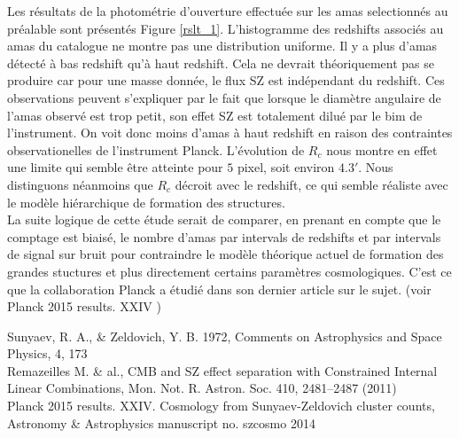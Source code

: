 \documentclass[a4paper,11pt]{article}
\begin{document}
Les résultats de la photométrie d'ouverture effectuée sur les amas
selectionnés au préalable sont présentés Figure
\ref{rslt_1}. L'histogramme des redshifts associés au amas du
catalogue ne montre pas une distribution uniforme. Il y a plus
d'amas détecté à bas redshift qu'à haut redshift. Cela ne devrait
théoriquement pas se produire car pour une masse donnée, le flux SZ
est indépendant du redshift. Ces observations peuvent s'expliquer par
le fait que lorsque le diamètre angulaire de l'amas observé est trop
petit, son effet SZ est totalement dilué par le bim de
l'instrument. On voit donc moins d'amas à haut redshift en raison des
contraintes observationelles de l'instrument Planck. L'évolution de
$R_c$ nous montre en effet une limite qui semble être atteinte pour $5$ pixel,
soit environ $4.3'$. Nous distinguons néanmoins que $R_c$ décroit avec
le redshift, ce qui semble réaliste avec le modèle hiérarchique de
formation des structures. \\

La suite logique de cette étude serait de comparer, en prenant en
compte que le comptage est biaisé, le nombre d'amas par intervals de
redshifts  et par intervals de signal sur bruit pour contraindre le modèle
théorique actuel de formation des grandes stuctures et plus
directement certains paramètres cosmologiques. C'est ce que la
collaboration Planck a étudié dans son dernier article sur le sujet. (voir Planck 2015
results. XXIV \cite{Planck_SZ}) 

\newpage
\begin{thebibliography}{2}

 Sunyaev, R. A., \& Zeldovich, Y. B. 1972, Comments on
  Astrophysics and Space Physics, 4, 173 \\
  
Remazeilles M. \& al., CMB and SZ effect
  separation with Constrained Internal Linear Combinations, 
  Mon. Not. R. Astron. Soc. 410, 2481–2487 (2011)  \\

 Planck 2015 results. XXIV. Cosmology from Sunyaev-Zeldovich
cluster counts, Astronomy \& Astrophysics manuscript no. szcosmo 2014
\end{thebibliography}

\end{document}
